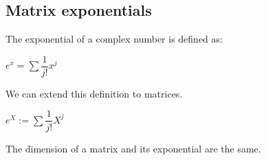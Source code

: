 
\subsection{Matrix exponentials}

The exponential of a complex number is defined as:

\(e^x=\sum \dfrac{1}{j!}x^j\)

We can extend this definition to matrices.

\(e^X:=\sum \dfrac{1}{j!}X^j\)

The dimension of a matrix and its exponential are the same.

